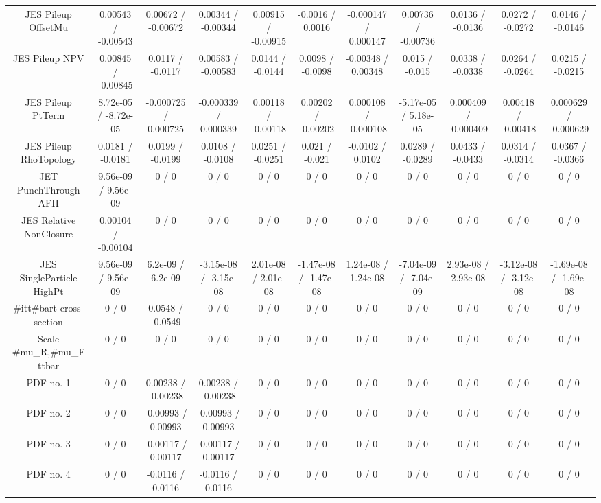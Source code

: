 \begin{table}[htbp]
\begin{center}
\begin{tabular}{|c|c|c|c|c|c|c|c|c|c|c|}
  JES Pileup OffsetMu & 0.00543 / -0.00543 & 0.00672 / -0.00672 & 0.00344 / -0.00344 & 0.00915 / -0.00915 & -0.0016 / 0.0016 & -0.000147 / 0.000147 & 0.00736 / -0.00736 & 0.0136 / -0.0136 & 0.0272 / -0.0272 & 0.0146 / -0.0146 \\ 
  JES Pileup NPV & 0.00845 / -0.00845 & 0.0117 / -0.0117 & 0.00583 / -0.00583 & 0.0144 / -0.0144 & 0.0098 / -0.0098 & -0.00348 / 0.00348 & 0.015 / -0.015 & 0.0338 / -0.0338 & 0.0264 / -0.0264 & 0.0215 / -0.0215 \\ 
  JES Pileup PtTerm & 8.72e-05 / -8.72e-05 & -0.000725 / 0.000725 & -0.000339 / 0.000339 & 0.00118 / -0.00118 & 0.00202 / -0.00202 & 0.000108 / -0.000108 & -5.17e-05 / 5.18e-05 & 0.000409 / -0.000409 & 0.00418 / -0.00418 & 0.000629 / -0.000629 \\ 
  JES Pileup RhoTopology & 0.0181 / -0.0181 & 0.0199 / -0.0199 & 0.0108 / -0.0108 & 0.0251 / -0.0251 & 0.021 / -0.021 & -0.0102 / 0.0102 & 0.0289 / -0.0289 & 0.0433 / -0.0433 & 0.0314 / -0.0314 & 0.0367 / -0.0366 \\ 
  JET PunchThrough AFII & 9.56e-09 / 9.56e-09 & 0 / 0 & 0 / 0 & 0 / 0 & 0 / 0 & 0 / 0 & 0 / 0 & 0 / 0 & 0 / 0 & 0 / 0 \\ 
  JES Relative NonClosure & 0.00104 / -0.00104 & 0 / 0 & 0 / 0 & 0 / 0 & 0 / 0 & 0 / 0 & 0 / 0 & 0 / 0 & 0 / 0 & 0 / 0 \\ 
  JES SingleParticle HighPt & 9.56e-09 / 9.56e-09 & 6.2e-09 / 6.2e-09 & -3.15e-08 / -3.15e-08 & 2.01e-08 / 2.01e-08 & -1.47e-08 / -1.47e-08 & 1.24e-08 / 1.24e-08 & -7.04e-09 / -7.04e-09 & 2.93e-08 / 2.93e-08 & -3.12e-08 / -3.12e-08 & -1.69e-08 / -1.69e-08 \\ 
  #it{t#bar{t}} cross-section & 0 / 0 & 0.0548 / -0.0549 & 0 / 0 & 0 / 0 & 0 / 0 & 0 / 0 & 0 / 0 & 0 / 0 & 0 / 0 & 0 / 0 \\ 
  Scale #mu_{R},#mu_{F} ttbar & 0 / 0 & 0 / 0 & 0 / 0 & 0 / 0 & 0 / 0 & 0 / 0 & 0 / 0 & 0 / 0 & 0 / 0 & 0 / 0 \\ 
  PDF no. 1 & 0 / 0 & 0.00238 / -0.00238 & 0.00238 / -0.00238 & 0 / 0 & 0 / 0 & 0 / 0 & 0 / 0 & 0 / 0 & 0 / 0 & 0 / 0 \\ 
  PDF no. 2 & 0 / 0 & -0.00993 / 0.00993 & -0.00993 / 0.00993 & 0 / 0 & 0 / 0 & 0 / 0 & 0 / 0 & 0 / 0 & 0 / 0 & 0 / 0 \\ 
  PDF no. 3 & 0 / 0 & -0.00117 / 0.00117 & -0.00117 / 0.00117 & 0 / 0 & 0 / 0 & 0 / 0 & 0 / 0 & 0 / 0 & 0 / 0 & 0 / 0 \\ 
  PDF no. 4 & 0 / 0 & -0.0116 / 0.0116 & -0.0116 / 0.0116 & 0 / 0 & 0 / 0 & 0 / 0 & 0 / 0 & 0 / 0 & 0 / 0 & 0 / 0 \\ 

\end{tabular}
\end{center}
\end{table}
